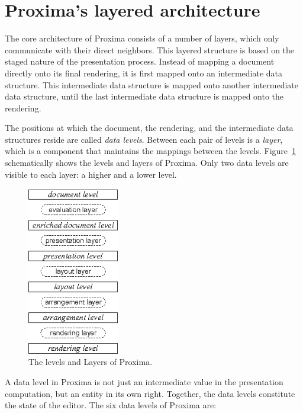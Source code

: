 \documentclass[12pt]{article}
\begin{document}
%
\section{Proxima's layered architecture} \label{sect:architecture}
%

The core architecture of Proxima consists of a number of layers, which only communicate with their direct neighbors. This layered structure is based on the staged nature of the presentation process. Instead of mapping a document directly onto its final rendering, it is first mapped onto an intermediate data structure. This intermediate data structure is mapped onto another intermediate data structure, until the last intermediate data structure is mapped onto the rendering.

The positions at which the document, the rendering, and the intermediate data structures reside are called {\em data levels}. Between each pair of levels is a {\em layer}, which is a component that maintains the mappings between the levels. Figure~\ref{fig:levelsAndLayers} schematically shows the levels and layers of Proxima. Only two data levels are visible to each layer: a higher and a lower level.

\begin{figure}[ht]
\centering
\includegraphics[width=4cm]{images/LevelLayerNames}
\caption{The levels and Layers of Proxima.}
\label{fig:levelsAndLayers}
\end{figure}

A data level in Proxima is not just an intermediate value in the presentation computation, but an entity in its own right. Together, the data levels constitute the state of the editor. The six data levels of Proxima are:
\end{document}
